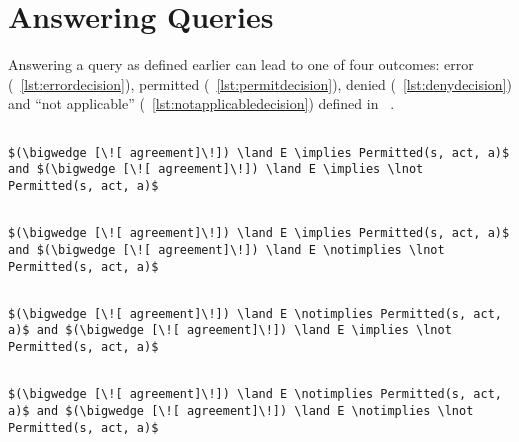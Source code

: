 \section{Answering Queries}\label{sec:answerqueriesodrl}

Answering a query as defined earlier can lead to one of four outcomes: error (~\ref{lst:errordecision}), permitted (~\ref{lst:permitdecision}), denied (~\ref{lst:denydecision}) and ``not applicable'' (~\ref{lst:notapplicabledecision}) defined in ~\cite{Tschantz}.

\lstset{mathescape, language=AST} 
\begin{lstlisting}[frame=single, caption={Answerable Queries: Error},label={lst:errordecision}]

$(\bigwedge [\![ agreement]\!]) \land E \implies Permitted(s, act, a)$ and $(\bigwedge [\![ agreement]\!]) \land E \implies \lnot Permitted(s, act, a)$

\end{lstlisting}

\lstset{mathescape, language=AST} 
\begin{lstlisting}[frame=single, caption={Answerable Queries: Permit},label={lst:permitdecision}]

$(\bigwedge [\![ agreement]\!]) \land E \implies Permitted(s, act, a)$ and $(\bigwedge [\![ agreement]\!]) \land E \notimplies \lnot Permitted(s, act, a)$

\end{lstlisting}

\lstset{mathescape, language=AST} 
\begin{lstlisting}[frame=single, caption={Answerable Queries: Deny},label={lst:denydecision}]

$(\bigwedge [\![ agreement]\!]) \land E \notimplies Permitted(s, act, a)$ and $(\bigwedge [\![ agreement]\!]) \land E \implies \lnot Permitted(s, act, a)$

\end{lstlisting}

\lstset{mathescape, language=AST} 
\begin{lstlisting}[frame=single, caption={Answerable Queries: Not Applicable},label={lst:notapplicabledecision}]

$(\bigwedge [\![ agreement]\!]) \land E \notimplies Permitted(s, act, a)$ and $(\bigwedge [\![ agreement]\!]) \land E \notimplies \lnot Permitted(s, act, a)$

\end{lstlisting}


